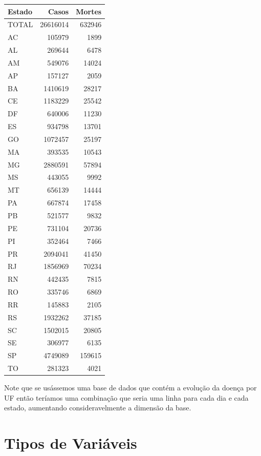 \documentclass[
]{book}
\begin{document}
\begin{tabular}{l|r|r}
\hline
Estado & Casos & Mortes\\
\hline
TOTAL & 26616014 & 632946\\
\hline
AC & 105979 & 1899\\
\hline
AL & 269644 & 6478\\
\hline
AM & 549076 & 14024\\
\hline
AP & 157127 & 2059\\
\hline
BA & 1410619 & 28217\\
\hline
CE & 1183229 & 25542\\
\hline
DF & 640006 & 11230\\
\hline
ES & 934798 & 13701\\
\hline
GO & 1072457 & 25197\\
\hline
MA & 393535 & 10543\\
\hline
MG & 2880591 & 57894\\
\hline
MS & 443055 & 9992\\
\hline
MT & 656139 & 14444\\
\hline
PA & 667874 & 17458\\
\hline
PB & 521577 & 9832\\
\hline
PE & 731104 & 20736\\
\hline
PI & 352464 & 7466\\
\hline
PR & 2094041 & 41450\\
\hline
RJ & 1856969 & 70234\\
\hline
RN & 442435 & 7815\\
\hline
RO & 335746 & 6869\\
\hline
RR & 145883 & 2105\\
\hline
RS & 1932262 & 37185\\
\hline
SC & 1502015 & 20805\\
\hline
SE & 306977 & 6135\\
\hline
SP & 4749089 & 159615\\
\hline
TO & 281323 & 4021\\
\hline
\end{tabular}

Note que se usássemos uma base de dados que contém a evolução da doença por UF então teríamos uma combinação que seria uma linha para cada dia e cada estado, aumentando consideravelmente a dimensão da base.

\hypertarget{tipos-de-variuxe1veis}{%
\section{Tipos de Variáveis}\label{tipos-de-variuxe1veis}}
\end{document}

